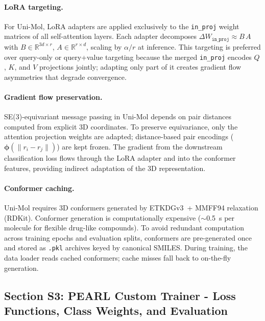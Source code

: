 \documentclass[9pt,a4paper]{article}
\begin{document}
\paragraph{LoRA targeting.}
For Uni-Mol, LoRA adapters are applied exclusively to the \texttt{in\_proj} weight
matrices of all self-attention layers.
Each adapter decomposes $\Delta W_{\texttt{in\_proj}} \approx B\,A$ with
$B \in \mathbb{R}^{3d \times r}$, $A \in \mathbb{R}^{r \times d}$, scaling by
$\alpha / r$ at inference.
This targeting is preferred over query-only or query+value targeting because
the merged \texttt{in\_proj} encodes $Q$, $K$, and $V$ projections jointly;
adapting only part of it creates gradient flow asymmetries that degrade convergence.

\paragraph{Gradient flow preservation.}
SE(3)-equivariant message passing in Uni-Mol depends on pair distances computed
from explicit 3D coordinates.
To preserve equivariance, only the attention projection weights are adapted;
distance-based pair encodings ($\boldsymbol{\phi}(\|r_i - r_j\|)$) are kept frozen.
The gradient from the downstream classification loss flows through the LoRA adapter
and into the conformer features, providing indirect adaptation of the 3D representation.

\paragraph{Conformer caching.}
Uni-Mol requires 3D conformers generated by ETKDGv3~+ MMFF94 relaxation (RDKit).
Conformer generation is computationally expensive ($\sim$0.5~s per molecule for
flexible drug-like compounds).
To avoid redundant computation across training epochs and evaluation splits,
conformers are pre-generated once and stored as
\texttt{.pkl} archives keyed by canonical SMILES.
During training, the data loader reads cached conformers; cache misses fall back
to on-the-fly generation.

\subsection*{Section S3: PEARL Custom Trainer - Loss Functions, Class Weights,
and Evaluation}
\end{document}
